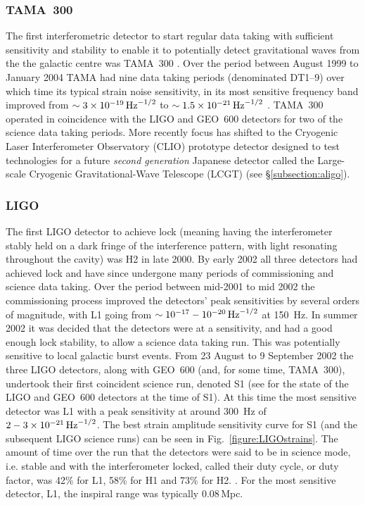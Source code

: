 \documentclass{article}
\begin{document}
\subsubsection{TAMA~300}
The first interferometric detector to start regular data taking with sufficient
sensitivity and stability to enable it to potentially detect gravitational waves from the the galactic
centre was TAMA~300 \cite{Ando:2001}. Over the period between August 1999 to
January 2004 TAMA had nine data taking periods (denominated DT1--9) over which
time its typical strain noise sensitivity, in its most sensitive frequency band
improved from $\sim3\times10^{-19}\,{\rm Hz}^{-1/2}$ to
$\sim1.5\times10^{-21}\,{\rm Hz}^{-1/2}$ \cite{Akutsu:2006}.  TAMA~300 operated 
in coincidence with the LIGO and GEO~600 detectors for two of the science data 
taking periods. More recently focus has shifted to the Cryogenic Laser 
Interferometer Observatory (CLIO) prototype detector \cite{Yamamoto:2008, 
CLIOweb} designed to test technologies for a future {\it second generation} Japanese detector
called the Large-scale Cryogenic Gravitational-Wave Telescope (LCGT) 
(see \S\ref{subsection:aligo}).

\subsubsection{LIGO}\label{sec:ligoruns}
The first LIGO detector to achieve lock (meaning having the interferometer stably 
held on a dark fringe of the interference pattern, with light resonating throughout 
the cavity) was H2 in late 2000.
By early 2002 all three detectors had achieved lock and have since
undergone many periods of commissioning and science data taking. Over the period
between mid-2001 to mid 2002 the commissioning process improved the detectors'
peak sensitivities by several orders of magnitude, with L1 going from
$\sim10^{-17}-10^{-20}\,{\rm Hz}^{-1/2}$ at 150~Hz. In summer 2002 it was
decided that the detectors were at a sensitivity, and had a good enough lock
stability, to allow a science data taking run. This was potentially sensitive to
local galactic burst events. From 23 August to 9 September 2002 the three LIGO
detectors, along with GEO~600 (and, for some time, TAMA~300), undertook their
first coincident science run, denoted S1 (see \cite{Abbott:2004a} for the state
of the LIGO and GEO~600 detectors at the time of S1). At this time the most
sensitive detector was L1 with a peak sensitivity at around 300~Hz of
$2-3\times10^{-21}\,{\rm Hz}^{-1/2}$. The best strain amplitude sensitivity
curve for S1 (and the subsequent LIGO science runs) can be seen in
Fig.~\ref{figure:LIGOstrains}. The amount of time over the run that the
detectors were said to be in science mode, i.e. stable and with the
interferometer locked, called their duty cycle, or duty factor, was 42\% for L1,
58\% for H1 and 73\% for H2. . For the most sensitive detector, L1, the 
inspiral range was typically 0.08\,Mpc.
\end{document}
